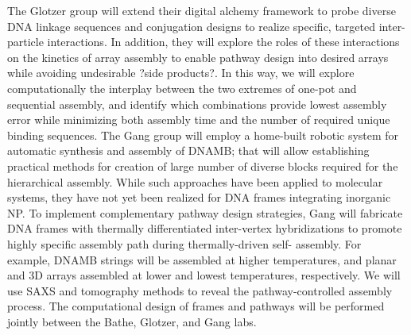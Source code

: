 \documentclass[12pt, oneside]{article}   	%
\begin{document}
The Glotzer group will extend their digital alchemy framework to probe diverse DNA linkage sequences and conjugation designs to realize specific, targeted inter-particle interactions. In addition, they will explore the roles of these interactions on the kinetics of array assembly to enable pathway design \cite{Jankowski_2012_SoftMatter} into desired arrays while avoiding undesirable ?side products?. In this way, we will explore computationally the interplay between the two extremes of one-pot and sequential assembly, and identify which combinations provide lowest assembly error while minimizing both assembly time and the number of required unique binding sequences. The Gang group will employ a home-built robotic system for automatic synthesis and assembly of DNAMB; that will allow establishing practical methods for creation of large number of diverse blocks required for the hierarchical assembly. While such approaches have been applied to molecular systems, they have not yet been realized for DNA frames integrating inorganic NP. To implement complementary pathway design strategies, Gang will fabricate DNA frames with thermally differentiated inter-vertex hybridizations to promote highly specific assembly path during thermally-driven self- assembly. For example, DNAMB strings will be assembled at higher temperatures, and planar and 3D arrays assembled at lower and lowest temperatures, respectively. We will use SAXS and tomography methods to reveal the pathway-controlled assembly process. The computational design of frames and pathways will be performed jointly between the Bathe, Glotzer, and Gang labs.
\end{document}
